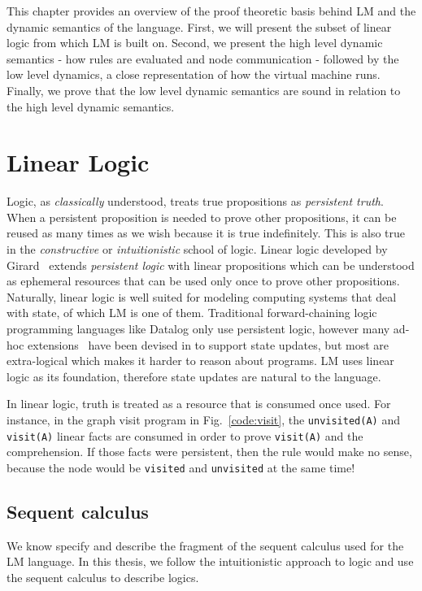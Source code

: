 This chapter provides an overview of the proof theoretic basis behind LM
and the dynamic semantics of the language. First, we will present the subset of
linear logic from which LM is built on. Second, we present the high level
dynamic semantics - how rules are evaluated and node communication - followed by
the low level dynamics, a close representation of how the virtual machine runs.
Finally, we prove that the low level dynamic semantics are sound in relation to
the high level dynamic semantics.

\section{Linear Logic}

Logic, as \emph{classically} understood, treats true propositions as \emph{persistent
truth}. When a persistent proposition is needed to prove other propositions, it can
be reused as many times as we wish because it is true indefinitely. This is
also true in the \emph{constructive} or \emph{intuitionistic} school of logic.
Linear logic developed by Girard~\cite{Girard95logic:its}
extends \emph{persistent logic} with linear propositions which can be understood
as ephemeral resources that can be used only once to prove other propositions.
Naturally, linear logic is well suited for modeling computing systems that deal
with state, of which LM is one of them.  Traditional forward-chaining logic
programming languages like Datalog only use persistent logic, however many
ad-hoc extensions~\cite{Liu98extendingdatalog,Ludascher95alogical} have been
devised in to support state updates, but most are extra-logical which makes it
harder to reason about programs. LM uses linear logic as its foundation,
therefore state updates are natural to the language.

In linear logic, truth is treated as a resource that is consumed once used. For
instance, in the graph visit program in Fig.~\ref{code:visit}, the
\texttt{unvisited(A)} and \texttt{visit(A)} linear facts are consumed in order
to prove \texttt{visit(A)} and the comprehension. If those facts were
persistent, then the rule would make no sense, because the node would be
\texttt{visited} and \texttt{unvisited} at the same time!

\subsection{Sequent calculus}

We know specify and describe the fragment of the sequent calculus used for the
LM language.  In this thesis, we follow the intuitionistic approach to logic and
use the sequent calculus to describe logics.

